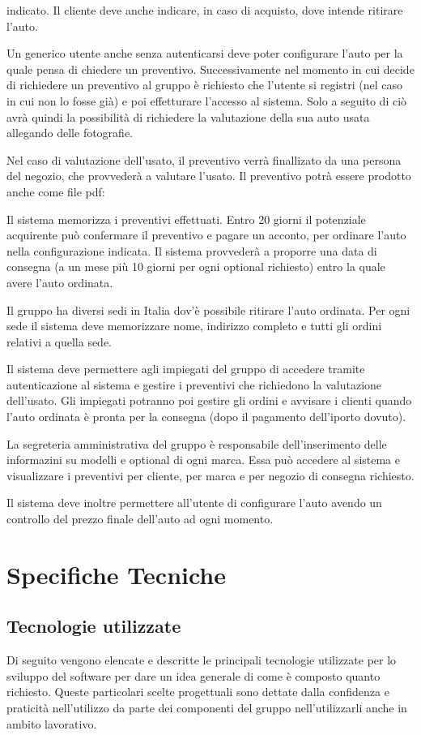 \documentclass[a4paper, 11pt,oneside]{book}
\newcommand{\spacing}{\par\bigskip\noindent}
\begin{document}
    indicato. Il cliente deve anche indicare, in caso di acquisto, dove intende ritirare l'auto.
    \spacing
    Un generico utente anche senza autenticarsi deve poter configurare l'auto per la quale pensa di chiedere un preventivo. Successivamente nel momento in cui decide di richiedere
    un preventivo al gruppo è richiesto che l'utente si registri (nel caso in cui non lo fosse già) e poi effetturare l'accesso al sistema. Solo a seguito di ciò avrà quindi la
    possibilità di richiedere la valutazione della sua auto usata allegando delle fotografie.
    \spacing
    Nel caso di valutazione dell'usato, il preventivo verrà finallizato da una persona del negozio, che provvederà a valutare l'usato. Il preventivo potrà essere prodotto anche come file pdf:
    \spacing
    Il sistema memorizza i preventivi effettuati. Entro 20 giorni il potenziale acquirente può confermare il preventivo e pagare un acconto, per ordinare l'auto nella configurazione
    indicata. Il sistema provvederà a proporre una data di consegna (a un mese più 10 giorni per ogni optional richiesto) entro la quale avere l'auto ordinata.
    \spacing
    Il gruppo ha diversi sedi in Italia dov'è possibile ritirare l'auto ordinata. Per ogni sede il sistema deve memorizzare nome, indirizzo completo e tutti gli ordini relativi a quella sede.
    \spacing
    Il sistema deve permettere agli impiegati del gruppo di accedere tramite autenticazione al sistema e gestire i preventivi che richiedono la valutazione dell'usato. Gli impiegati potranno poi 
    gestire gli ordini e avvisare i clienti quando l'auto ordinata è pronta per la consegna (dopo il pagamento dell'iporto dovuto).
    \spacing
    La segreteria amministrativa del gruppo è responsabile dell'inserimento delle informazini su modelli e optional di ogni marca. Essa può accedere al sistema e visualizzare i preventivi per cliente, per marca
    e per negozio di consegna richiesto.
    \spacing
    Il sistema deve inoltre permettere all'utente di configurare l'auto avendo un controllo del prezzo finale dell'auto ad ogni momento. 



\chapter{Specifiche Tecniche}
    \section{Tecnologie utilizzate}
        Di seguito vengono elencate e descritte le principali tecnologie utilizzate per lo sviluppo del software per dare un idea generale di come è composto quanto richiesto. Queste particolari scelte progettuali sono dettate dalla confidenza
        e praticità nell'utilizzo da parte dei componenti del gruppo nell'utilizzarli anche in ambito lavorativo.
\end{document}
